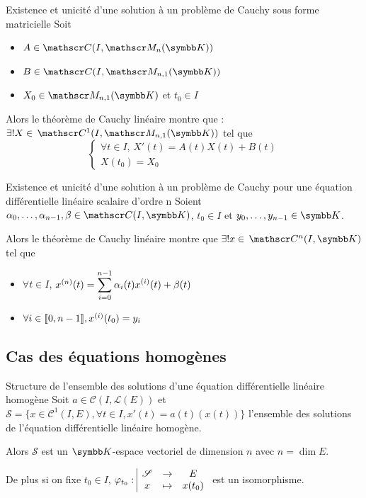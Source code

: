 \begin{corollairent}{Existence et unicité d'une solution à un problème de Cauchy sous forme matricielle}{}
    Soit 
    \begin{itemize}
        \item $A \in \mathscr C(I, \mathscr M_n(\K))$
        \item $B \in \mathscr C(I, \mathscr M_{n,1}(\K))$
        \item $X_0 \in \mathscr M_{n,1}(\K)$ et $t_0 \in I$
    \end{itemize}

    Alors le théorème de Cauchy linéaire montre que :  
    $\exists ! X \in \mc 1(I, \mathscr M_{n,1}(\K))$ tel que 
    $$\begin{cases}
        \forall t \in I, \, X'(t) = A(t) X(t) + B(t) \\
        X(t_0) = X_0
    \end{cases}$$
\end{corollairent}

\begin{theorement}{Existence et unicité d'une solution à un problème de Cauchy pour une équation différentielle linéaire scalaire d'ordre n}{}
    Soient $\alpha_0, \dots, \alpha_{n-1}, \beta \in \mathscr C(I, \K)$, $t_0 \in I$ et $y_0, \dots, y_{n-1} \in \K$.

    Alors le théorème de Cauchy linéaire montre que $\exists ! x \in \mc n (I, \K)$ 
    tel que 
    
    \begin{itemize}
        \item $\forall t \in I$, $x^{(n)}(t) = \displaystyle \sum_{i = 0}^{n - 1} \alpha_i(t) x^{(i)}(t) + \beta(t)$
        \item $\forall i \in [\![0, n - 1]\!], x^{(i)}(t_0) = y_i$
    \end{itemize} 
\end{theorement}

\subsection{Cas des équations homogènes}


\lvspace \avspace \begin{theorement}{Structure de l'ensemble des solutions d'une équation différentielle linéaire homogène}{}
    Soit $a \in \mathscr C(I, \mathscr L(E))$ et $\mathscr S = \{ x \in \mathscr C^1(I, E), \forall t \in I, x'(t) = a(t)(x(t)) \}$ 
    l'ensemble des solutions de l'équation différentielle linéaire homogène.

    Alors $\mathscr S$ est un $\K$-espace vectoriel de dimension $n$ avec $n = \dim E$. 

    De plus si on fixe $t_0 \in I$, $\varphi_{t_0}: \space \begin{array}{|ccc} \displaystyle \mathscr S & \to & \displaystyle E \\ \displaystyle x & \mapsto & \displaystyle x(t_0) \end{array}$ est un isomorphisme. 
\end{theorement}

